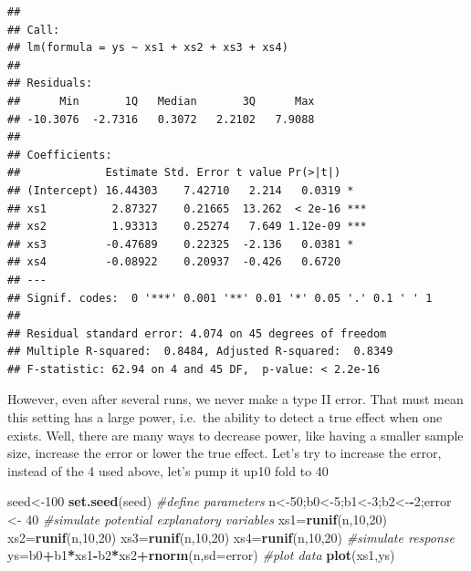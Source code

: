 \documentclass[
]{book}
\newenvironment{Shaded}{\begin{snugshade}}{\end{snugshade}}
\newcommand{\AttributeTok}[1]{\textcolor[rgb]{0.13,0.29,0.53}{#1}}
\newcommand{\CommentTok}[1]{\textcolor[rgb]{0.56,0.35,0.01}{\textit{#1}}}
\newcommand{\DecValTok}[1]{\textcolor[rgb]{0.00,0.00,0.81}{#1}}
\newcommand{\FunctionTok}[1]{\textcolor[rgb]{0.13,0.29,0.53}{\textbf{#1}}}
\newcommand{\NormalTok}[1]{#1}
\newcommand{\OtherTok}[1]{\textcolor[rgb]{0.56,0.35,0.01}{#1}}
\newcommand{\SpecialCharTok}[1]{\textcolor[rgb]{0.81,0.36,0.00}{\textbf{#1}}}
\begin{document}
\begin{verbatim}
## 
## Call:
## lm(formula = ys ~ xs1 + xs2 + xs3 + xs4)
## 
## Residuals:
##      Min       1Q   Median       3Q      Max 
## -10.3076  -2.7316   0.3072   2.2102   7.9088 
## 
## Coefficients:
##             Estimate Std. Error t value Pr(>|t|)    
## (Intercept) 16.44303    7.42710   2.214   0.0319 *  
## xs1          2.87327    0.21665  13.262  < 2e-16 ***
## xs2          1.93313    0.25274   7.649 1.12e-09 ***
## xs3         -0.47689    0.22325  -2.136   0.0381 *  
## xs4         -0.08922    0.20937  -0.426   0.6720    
## ---
## Signif. codes:  0 '***' 0.001 '**' 0.01 '*' 0.05 '.' 0.1 ' ' 1
## 
## Residual standard error: 4.074 on 45 degrees of freedom
## Multiple R-squared:  0.8484, Adjusted R-squared:  0.8349 
## F-statistic: 62.94 on 4 and 45 DF,  p-value: < 2.2e-16
\end{verbatim}

However, even after several runs, we never make a type II error. That must mean this setting has a large power, i.e.~the ability to detect a true effect when one exists. Well, there are many ways to decrease power, like having a smaller sample size, increase the error or lower the true effect. Let's try to increase the error, instead of the 4 used above, let's pump it up10 fold to 40

\begin{Shaded}
\begin{Highlighting}[]
\NormalTok{seed}\OtherTok{\textless{}{-}}\DecValTok{100}
\FunctionTok{set.seed}\NormalTok{(seed)}
\CommentTok{\#define parameters}
\NormalTok{n}\OtherTok{\textless{}{-}}\DecValTok{50}\NormalTok{;b0}\OtherTok{\textless{}{-}}\DecValTok{5}\NormalTok{;b1}\OtherTok{\textless{}{-}}\DecValTok{3}\NormalTok{;b2}\OtherTok{\textless{}{-}}\SpecialCharTok{{-}}\DecValTok{2}\NormalTok{;error }\OtherTok{\textless{}{-}} \DecValTok{40}
\CommentTok{\#simulate potential explanatory variables}
\NormalTok{xs1}\OtherTok{=}\FunctionTok{runif}\NormalTok{(n,}\DecValTok{10}\NormalTok{,}\DecValTok{20}\NormalTok{)}
\NormalTok{xs2}\OtherTok{=}\FunctionTok{runif}\NormalTok{(n,}\DecValTok{10}\NormalTok{,}\DecValTok{20}\NormalTok{)}
\NormalTok{xs3}\OtherTok{=}\FunctionTok{runif}\NormalTok{(n,}\DecValTok{10}\NormalTok{,}\DecValTok{20}\NormalTok{)}
\NormalTok{xs4}\OtherTok{=}\FunctionTok{runif}\NormalTok{(n,}\DecValTok{10}\NormalTok{,}\DecValTok{20}\NormalTok{)}
\CommentTok{\#simulate response}
\NormalTok{ys}\OtherTok{=}\NormalTok{b0}\SpecialCharTok{+}\NormalTok{b1}\SpecialCharTok{*}\NormalTok{xs1}\SpecialCharTok{{-}}\NormalTok{b2}\SpecialCharTok{*}\NormalTok{xs2}\SpecialCharTok{+}\FunctionTok{rnorm}\NormalTok{(n,}\AttributeTok{sd=}\NormalTok{error)}
\CommentTok{\#plot data}
\FunctionTok{plot}\NormalTok{(xs1,ys)}
\end{Highlighting}
\end{Shaded}
\end{document}
